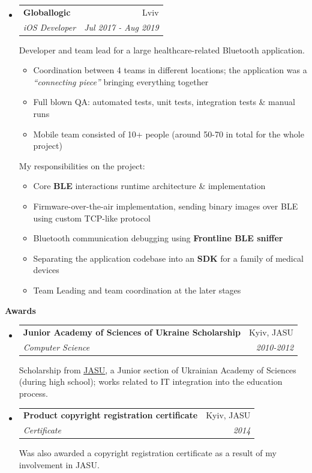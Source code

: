 \documentclass[letterpaper,11pt]{article}
\makeatletter
\newcommand{\resitem}[1]{\item #1 \vspace{-2pt}}
\newcommand{\resheading}[1]{{\vspace{.2in} \large \colorbox{title_bg}{\begin{minipage}{\textwidth}{\textbf{#1 \vphantom{p\^{E}}}}\end{minipage}}}}
\newcommand{\ressubheading}[4]{
\begin{tabular*}{7.1in}{l@{\extracolsep{\fill}}r}
		\textbf{#1} & #2 \\
		\textit{#3} & \textit{#4} \\
\end{tabular*}\vspace{0pt}}
\makeatother
\begin{document}
\begin{itemize}
	\item
		\ressubheading{Globallogic}{Lviv}{iOS Developer}{Jul 2017 - Aug 2019}

		Developer and team lead for a large healthcare-related Bluetooth application.
		\begin{itemize}
				\resitem{Coordination between 4 teams in different locations; the application was a \textit{``connecting piece''} bringing everything together}
				\resitem{Full blown QA: automated tests, unit tests, integration tests \& manual runs}
				\resitem{Mobile team consisted of 10+ people (around 50-70 in total for the whole project)}
		\end{itemize}

		My responsibilities on the project:
		\begin{itemize}
				\resitem{Core \textbf{BLE} interactions runtime architecture \& implementation}
				\resitem{Firmware-over-the-air implementation, sending binary images over BLE using custom TCP-like protocol}
				\resitem{Bluetooth communication debugging using \textbf{Frontline BLE sniffer}}
				\resitem{Separating the application codebase into an \textbf{SDK} for a family of medical devices}
				\resitem{Team Leading and team coordination at the later stages}
		\end{itemize}

\end{itemize}

\resheading{Awards}
\begin{itemize}
	\item
		\ressubheading{Junior Academy of Sciences of Ukraine Scholarship}{Kyiv, JASU}{Computer Science}{2010-2012}

		Scholarship from \href{http://man.gov.ua/en}{\textcolor{link_fg}{\underline{JASU}}}, a Junior section of Ukrainian Academy of Sciences (during high school); works related to IT integration into the education process.
	\item
		\ressubheading{Product copyright registration certificate}{Kyiv, JASU}{Certificate \textnumero40491}{2014}

		Was also awarded a copyright registration certificate as a result of my involvement in JASU.
\end{itemize}
\end{document}
